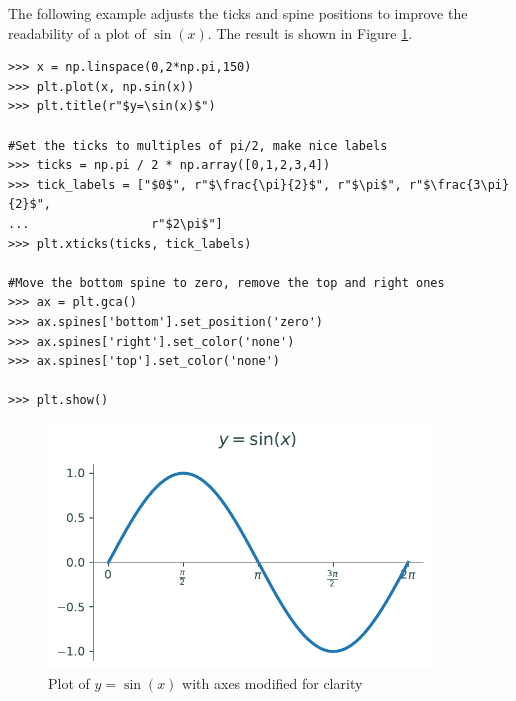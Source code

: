 The following example adjusts the ticks and spine positions to improve the readability of a plot of $\sin(x)$. The result is shown in Figure \ref{mpl:spines}.
\begin{lstlisting}
>>> x = np.linspace(0,2*np.pi,150)
>>> plt.plot(x, np.sin(x))
>>> plt.title(r"$y=\sin(x)$")

#Set the ticks to multiples of pi/2, make nice labels
>>> ticks = np.pi / 2 * np.array([0,1,2,3,4])
>>> tick_labels = ["$0$", r"$\frac{\pi}{2}$", r"$\pi$", r"$\frac{3\pi}{2}$",
...                 r"$2\pi$"]
>>> plt.xticks(ticks, tick_labels)

#Move the bottom spine to zero, remove the top and right ones
>>> ax = plt.gca()
>>> ax.spines['bottom'].set_position('zero')
>>> ax.spines['right'].set_color('none')
>>> ax.spines['top'].set_color('none')

>>> plt.show()
\end{lstlisting}
\begin{figure}[H]
\centering
\includegraphics[width=4in]{figures/axis_example.pdf}
\caption{Plot of $y=\sin(x)$ with axes modified for clarity}
\label{mpl:spines}
\end{figure}

